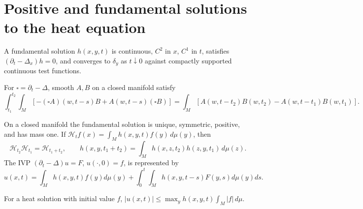 \section{Positive and fundamental solutions to the heat equation}

\begin{definition}
\label{def:chow-ii-heat-fundamental-solution}
A fundamental solution $h(x,y,t)$ is continuous, $C^2$ in $x$, $C^1$ in $t$,
satisfies $(\partial_t-\Delta_x)h=0$, and converges to $\delta_y$ as
$t\downarrow0$ against compactly supported continuous test functions.
\end{definition}

\begin{lemma}
\label{lem:chow-ii-duhamel-closed}
For $\square=\partial_t-\Delta$, smooth $A,B$ on a closed manifold satisfy
\[
\int_{t_1}^{t_2}\!\int_M[-(\square A)(w,t-s)B+A(w,t-s)(\square B)]
=\int_M[A(w,t-t_2)B(w,t_2)-A(w,t-t_1)B(w,t_1)].
\]
\end{lemma}

\begin{theorem}
\label{thm:chow-ii-closed-heat-kernel}
On a closed manifold the fundamental solution is unique, symmetric, positive,
and has mass one.  If $\mathscr H_t f(x)=\int_M h(x,y,t)f(y)\,d\mu(y)$, then
\[
\mathscr H_{t_2}\mathscr H_{t_1}=\mathscr H_{t_1+t_2},\qquad
h(x,y,t_1+t_2)=\int_M h(x,z,t_2)h(z,y,t_1)\,d\mu(z).
\]
The IVP $(\partial_t-\Delta)u=F$, $u(\cdot,0)=f$, is represented by
\[
u(x,t)=\int_Mh(x,y,t)f(y)d\mu(y)+\int_0^t\!\int_Mh(x,y,t-s)F(y,s)d\mu(y)ds.
\]
\end{theorem}

\begin{corollary}
\label{cor:chow-ii-heat-kernel-sup-bound}
For a heat solution with initial value $f$,
$|u(x,t)|\le\max_yh(x,y,t)\int_M|f|\,d\mu$.
\end{corollary}

